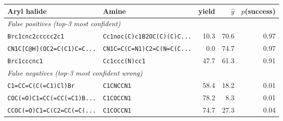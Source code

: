 \begin{tabular}{p{3.0cm}p{3.2cm}rrr}
\toprule
Aryl halide & Amine & yield & $\hat y$ & $p$(success) \\
\midrule
\multicolumn{5}{l}{\emph{False positives (top-3 most confident)}} \\
\texttt{Brc1cnc2ccccc2c1} & \texttt{Cc1noc(C)c1B2OC(C)(C)C...} & 10.3 & 70.6 & 0.97 \\
\texttt{CN1C[C@H](OC2=C(C1)C=C...} & \texttt{CN1C=C(C=N1)C2=C(N=C(C...} & 0.0 & 74.7 & 0.97 \\
\texttt{Brc1cccnc1} & \texttt{Cc1ccc(N)cc1} & 47.7 & 61.3 & 0.91 \\
\midrule
\multicolumn{5}{l}{\emph{False negatives (top-3 most confident wrong)}} \\
\texttt{C1=CC=C(C(=C1)Cl)Br} & \texttt{C1CNCCN1} & 58.4 & 18.2 & 0.01 \\
\texttt{COC(=O)C1=CC(=CC(=C1)B...} & \texttt{C1COCCN1} & 78.2 & 8.3 & 0.01 \\
\texttt{CCOC(=O)C1=C(C2=CC(=C(...} & \texttt{C1COCCN1} & 74.7 & 27.3 & 0.04 \\
\bottomrule
\end{tabular}